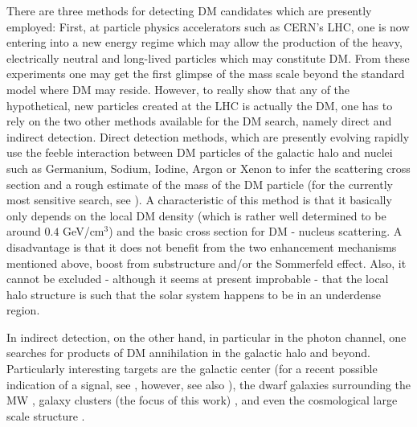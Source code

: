 \documentclass[10pt,aps,pra,reprint,amsmath,amsfonts,amssymb,showpacs,nofootinbib,floatfix]{revtex4-1}
\begin{document}
There are three methods for detecting DM candidates which are
presently employed: First, at particle physics accelerators such as
CERN's LHC, one is now entering into a new energy regime which may
allow the production of the heavy, electrically neutral and long-lived
particles which may constitute DM. From these experiments one may get
the first glimpse of the mass scale beyond the standard model where DM
may reside. However, to really show that any of the hypothetical, new
particles created at the LHC is actually the DM, one has to rely on
the two other methods available for the DM search, namely direct and
indirect detection. Direct detection methods, which are presently
evolving rapidly use the feeble interaction between DM particles of
the galactic halo and nuclei such as Germanium, Sodium, Iodine, Argon
or Xenon to infer the scattering cross section and a rough estimate of
the mass of the DM particle (for the currently most sensitive search,
see \cite{Aprile:2010um,Aprile:2011hi}). A characteristic of this
method is that it basically only depends on the local DM density
(which is rather well determined to be around $0.4$ GeV/cm$^3$) and
the basic cross section for DM - nucleus scattering. A disadvantage is
that it does not benefit from the two enhancement mechanisms mentioned
above, boost from substructure and/or the Sommerfeld effect. Also, it
cannot be excluded - although it seems at present improbable - that
the local halo structure is such that the solar system happens to be
in an underdense region.

In indirect detection, on the other hand, in particular in the photon
channel, one searches for products of DM annihilation in the galactic
halo and beyond. Particularly interesting targets are the galactic
center (for a recent possible indication of a signal, see
\cite{2010arXiv1010.2752H}, however, see also
\cite{2010arXiv1012.5839B}), the dwarf galaxies surrounding the MW
\cite{Strigari:2006rd,Essig:2009jx,2010JCAP...01..031S}, galaxy
clusters (the focus of this work)
\cite{Ghigna:1998vn,Lewis:2002mfa,Boyarsky:2006kc,2006A&A...455...21C,2009PhRvL.103r1302P},
and even the cosmological large scale structure
\cite{Bergstrom:2001jj,Ullio:2002pj,Taylor:2002zd,Elsaesser:2004ap,2011MNRAS.tmp..503C,Abazajian:2010sq,Abdo:2010dk,Zavala:2011tt}.
\end{document}
